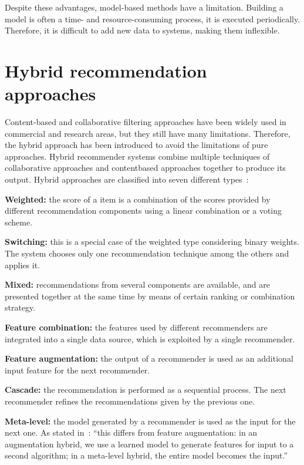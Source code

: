 \documentclass[oneside,13pt]{extreport}
\begin{document}
Despite these advantages, model-based methods have a limitation. Building a model is often a time- and resource-consuming process, it is executed periodically. Therefore, it is difficult to add new data to systems, making them inflexible.

\section{Hybrid recommendation approaches}
Content-based and collaborative filtering approaches have been widely used in commercial and research areas, but they still have many limitations. Therefore, the hybrid approach has been introduced to avoid the limitations of pure approaches. Hybrid recommender systems combine multiple techniques of collaborative approaches and contentbased approaches together to produce its output. Hybrid approaches are classified into seven different types~\cite{Burke07}:

\begin{description}
    \item{\textbf{Weighted:}}  the score of a item is a combination of the scores provided by different recommendation components  using a linear combination or a voting scheme. 
    \item{\textbf{Switching:}} this is a special case of the weighted type considering binary weights. The system chooses only one recommendation technique among the others and applies it. 
    \item{\textbf{Mixed:}} recommendations from several components are available, and are presented together at the same time by means of certain ranking or combination strategy.
    \item{\textbf{Feature combination:}} the features used by different recommenders are integrated into a single data source, which is exploited by a single recommender.
    \item{\textbf{Feature augmentation:}} the output of a recommender is used as an additional input feature for the next recommender.
    \item{\textbf{Cascade:}} the recommendation is performed as a sequential process. The next recommender refines the recommendations given by the previous one. 
    \item{\textbf{Meta-level:}} the model generated by a recommender is used as the input for the next one. As stated in~\cite{Burke02}: “this differs from feature augmentation: in an augmentation hybrid, we use a learned model to generate features for input to a second algorithm; in a meta-level hybrid, the entire model becomes the input.”
\end{description}
\end{document}
